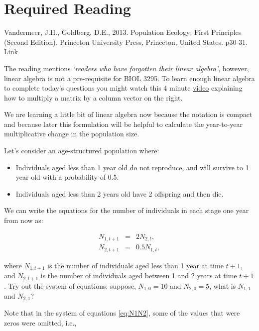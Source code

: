 \documentclass[]{book}
\begin{document}
\section{Required Reading}\label{required-reading}

Vandermeer, J.H., Goldberg, D.E., 2013. Population Ecology: First
Principles (Second Edition). Princeton University Press, Princeton,
United States. p30-31.
\href{https://ebookcentral-proquest-com.qe2a-proxy.mun.ca/lib/mun/detail.action?docID=1205619}{Link}

The reading mentions \emph{`readers who have forgotten their linear
algebra'}, however, linear algebra is not a pre-requisite for BIOL 3295.
To learn enough linear algebra to complete today's questions you might
watch this 4 minute
\href{https://www.youtube.com/watch?v=Awcj447pYuk}{video} explaining how
to multiply a matrix by a column vector on the right.

We are learning a little bit of linear algebra now because the notation
is compact and because later this formulation will be helpful to
calculate the year-to-year multiplicative change in the population size.

Let's consider an age-structured population where:

\begin{itemize}
\item
  Individuals aged less than 1 year old do not reproduce, and will
  survive to 1 year old with a probability of 0.5.
\item
  Individuals aged less than 2 years old have 2 offspring and then die.
\end{itemize}

We can write the equations for the number of individuals in each stage
one year from now as:

\begin{eqnarray}
N_{1,t+1} & = & 2 N_{2,t}, \nonumber \\
N_{2,t+1} & = & 0.5 N_{1,t}, 
 \label{eq:N1N2}
\end{eqnarray}

where \(N_{1,t+1}\) is the number of individuals aged less than 1 year
at time \(t+1\), and \(N_{2,t+1}\) is the number of individuals aged
between 1 and 2 years at time \(t+1\). Try out the system of equations:
suppose, \(N_{1,0} = 10\) and \(N_{2,0} = 5\), what is \(N_{1,1}\) and
\(N_{2,1}\)?

Note that in the system of equations \eqref{eq:N1N2}, some of the values
that were zeros were omitted, i.e.,
\end{document}
